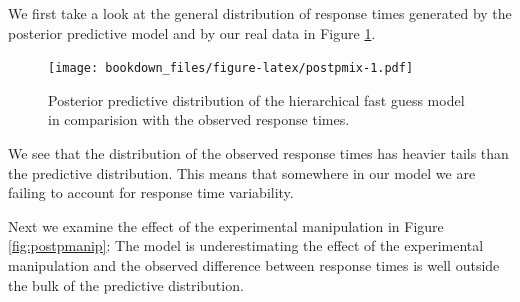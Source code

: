 \documentclass[12pt,]{krantz}
\newenvironment{Shaded}{\begin{snugshade}}{\end{snugshade}}
\newcommand{\ControlFlowTok}[1]{\textcolor[rgb]{0.13,0.29,0.53}{\textbf{#1}}}
\newcommand{\DataTypeTok}[1]{\textcolor[rgb]{0.13,0.29,0.53}{#1}}
\newcommand{\DecValTok}[1]{\textcolor[rgb]{0.00,0.00,0.81}{#1}}
\newcommand{\FloatTok}[1]{\textcolor[rgb]{0.00,0.00,0.81}{#1}}
\newcommand{\KeywordTok}[1]{\textcolor[rgb]{0.13,0.29,0.53}{\textbf{#1}}}
\newcommand{\NormalTok}[1]{#1}
\newcommand{\OperatorTok}[1]{\textcolor[rgb]{0.81,0.36,0.00}{\textbf{#1}}}
\newcommand{\StringTok}[1]{\textcolor[rgb]{0.31,0.60,0.02}{#1}}
\theoremstyle{definition}
\theoremstyle{definition}
\theoremstyle{definition}
\theoremstyle{remark}
\begin{document}
We first take a look at the general distribution of response times generated by the posterior predictive model and by our real data in Figure \ref{fig:postpmix}.



\begin{Shaded}
\end{Shaded}

\begin{figure}
\centering
\texttt{[image: bookdown\_files/figure-latex/postpmix-1.pdf]}
\caption{\label{fig:postpmix}Posterior predictive distribution of the hierarchical fast guess model in comparision with the observed response times.}
\end{figure}

We see that the distribution of the observed response times has heavier tails than the predictive distribution. This means that somewhere in our model we are failing to account for response time variability.

Next we examine the effect of the experimental manipulation in Figure \ref{fig:postpmanip}: The model is underestimating the effect of the experimental manipulation and the observed difference between response times is well outside the bulk of the predictive distribution.



\begin{Shaded}
\end{Shaded}
\end{document}
